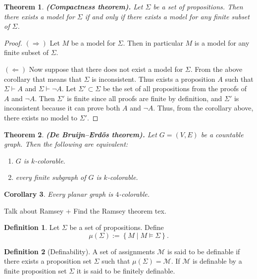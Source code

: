 \documentclass[11pt,a4paper]{article}
\theoremstyle{definition}
\newtheorem{definition}{Definition}[section]
\theoremstyle{plain}
\newtheorem{theorem}{Theorem}[section]
\newtheorem{corollary}[theorem]{Corollary}
\newcommand{\set}[2]{ \left\{ #1 \mid #2 \right\} }
\renewcommand{\tt}[1]{\textnormal{\textbf{(#1).}}} %
\begin{document}
  \begin{theorem}\tt{Compactness theorem}
    Let $\Sigma$ be a set of propositions.
    Then there exists a model for $\Sigma$ if and only if
    there exists a model for any finite subset of $\Sigma$.
  \end{theorem}
  \begin{proof}
    $(\Rightarrow)$ Let $M$ be a model for $\Sigma$.
    Then in particular $M$ is a model for any finite subset of $\Sigma$.

    $(\Leftarrow)$ Now suppose that there does not exist a model for $\Sigma$.
    From the above corollary that means that $\Sigma$ is inconsistent.
    Thus exists a proposition $A$ such that
    $\Sigma \vdash A$ and $\Sigma \vdash \neg A$.
    Let $\Sigma' \subset \Sigma$ be the set of all propositions from
    the proofs of $A$ and $\neg A$.
    Then $\Sigma'$ is finite since all proofs are finite by definition,
    and $\Sigma'$ is inconsistent because it can prove both $A$ and $\neg A$.
    Thus, from the corollary above, there exists no model to $\Sigma'$.
  \end{proof}

  \begin{theorem}\tt{De Bruijn–Erdős theorem}
    Let $G = (V, E)$ be a countable graph.
    Then the following are equivalent:
    \begin{enumerate}
      \item[(1)] $G$ is $k$-colorable.
      \item[(2)] every finite subgraph of $G$ is $k$-colorable.
    \end{enumerate}
  \end{theorem}

  \begin{corollary}
    Every planar graph is $4$-colorable.
  \end{corollary}

  Talk about Ramsey + Find the Ramsey theorem tex.

  \begin{definition}
    Let $\Sigma$ be a set of propositions. Define
    \[
      \mu(\Sigma) := \set{M}{M \models \Sigma}.
    \]
  \end{definition}

  \begin{definition}[Definability]
    A set of assignments $\mathcal M$ is said to be definable if there
    exists a proposition set $\Sigma$ such that $\mu(\Sigma) = \mathcal M$.
    If $\mathcal M$ is definable by a finite proposition set $\Sigma$ it is
    said to be finitely definable.
  \end{definition}
\end{document}
